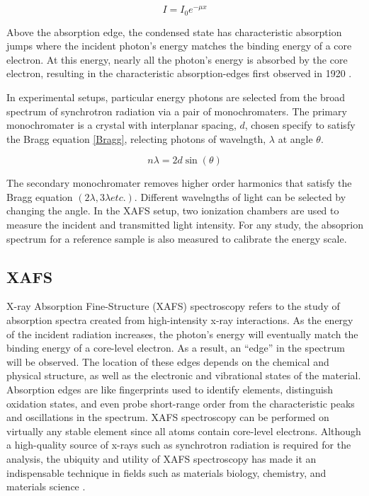 \begin{equation}
    \label{BeerLambert}
    I = I_0 e^{-\mu x}
\end{equation}

Above the absorption edge, the condensed state has characteristic absorption jumps where the incident photon's energy matches the binding energy of a core electron. At this energy, nearly all the photon's energy is absorbed by the core electron, resulting in the characteristic absorption-edges first observed in 1920 \cite{fricke1920, hertz1920ueber}.

In experimental setups, particular energy photons are selected from the broad spectrum of synchrotron radiation via a pair of monochromaters. The primary monochromater is a crystal with interplanar spacing, $ d $, chosen specify to satisfy the Bragg equation \ref{Bragg}, relecting photons of wavelngth, $ \lambda $ at angle $ \theta $.  

\begin{equation}
    \label{Bragg}
    n\lambda = 2d\sin(\theta)
\end{equation}

The secondary monochromater removes higher order harmonics that satisfy the Bragg equation $ (2\lambda, 3\lambda etc.). $ Different wavelngths of light can be selected by changing the angle. In the XAFS setup, two ionization chambers are used to measure the incident and transmitted light intensity. For any study, the absoprion spectrum for a reference sample is also measured to calibrate the energy scale.


\subsection{XAFS}
X-ray Absorption Fine-Structure (XAFS) spectroscopy refers to the study of absorption spectra created from high-intensity x-ray interactions. As the energy of the incident radiation increases, the photon's energy will eventually match the binding energy of a core-level electron. As a result, an ``edge'' in the spectrum will be observed. The location of these edges depends on the chemical and physical structure, as well as the electronic and vibrational states of the material. Absorption edges are like fingerprints used to identify elements, distinguish oxidation states, and even probe short-range order from the characteristic peaks and oscillations in the spectrum. XAFS spectroscopy can be performed on virtually any stable element since all atoms contain core-level electrons. Although a high-quality source of x-rays such as synchrotron radiation is required for the analysis, the ubiquity and utility of XAFS spectroscopy has made it an indispensable technique in fields such as materials biology, chemistry, and materials science \cite{rehrXAFS2000review} \cite{newville2014fundamentals}.

